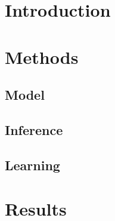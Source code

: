 \maketitle

\begin{abstract}
 

\end{abstract}

\section{Introduction}


\section{Methods} \label{sec:methods}

\subsection{Model}


\subsection{Inference} \label{sec:inf}



\subsection{Learning} \label{sec:est}


\section{Results}

